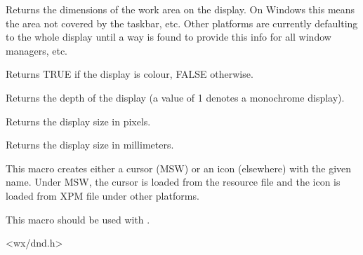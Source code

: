 

Returns the dimensions of the work area on the display.  On Windows
this means the area not covered by the taskbar, etc.  Other platforms
are currently defaulting to the whole display until a way is found to
provide this info for all window managers, etc.

\label{wxcolourdisplay}


Returns TRUE if the display is colour, FALSE otherwise.

\label{wxdisplaydepth}


Returns the depth of the display (a value of 1 denotes a monochrome display).

\label{wxdisplaysize}



Returns the display size in pixels.

\label{wxdisplaysizemm}



Returns the display size in millimeters.

\label{wxdropicon}


This macro creates either a cursor (MSW) or an icon (elsewhere) with the given
name. Under MSW, the cursor is loaded from the resource file and the icon is
loaded from XPM file under other platforms.

This macro should be used with
.


<wx/dnd.h>

\label{wxiconmacro}

